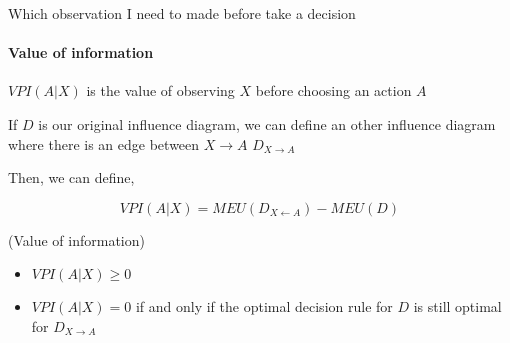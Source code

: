 
\begin{framed} \centering
Which observation I need to made before take a decision 
\end{framed}

\paragraph{Value of information}

\begin{definition}
 $VPI(A|X)$ is the value of observing $X$ before choosing an action $A$
\end{definition}

If $D$ is our original influence diagram, we can define an other influence diagram where there is an edge between $X \rightarrow A$ $D_{X \rightarrow A}$

Then, we can define,

\begin{equation}\label{eq:vpi}
 VPI(A | X) = MEU(D_{X \leftarrow A}) - MEU(D)
\end{equation}

\begin{figure}[H]
 \centering
 \begin{subfigure}[c]{0.32\textwidth}
 \caption{}
 \label{fig:market_survey_found_withOutObs}
 \end{subfigure}
 \begin{subfigure}[c]{0.32\textwidth}
  \caption{}
 \label{fig:market_survey_found_withObs}
 \end{subfigure}
 \caption{}
 \label{fig:market_survey_found}
\end{figure}

\begin{theorem}(Value of information)
 \begin{itemize}
  \item $VPI(A|X) \geq 0$ 
  \item $VPI(A|X) = 0$ if and only if the optimal decision rule for $D$ is still optimal for $D_{X\rightarrow A}$
 \end{itemize}
\end{theorem}


